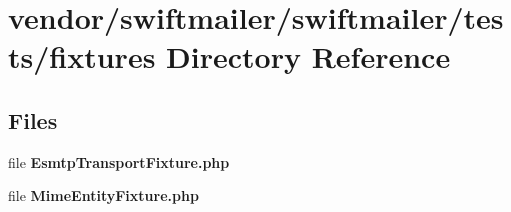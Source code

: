 \section{vendor/swiftmailer/swiftmailer/tests/fixtures Directory Reference}
\label{dir_cb93ca46459b0ee6d89acfe53fe00125}
\subsection*{Files}
\begin{DoxyCompactItemize}
\item 
file {\bf Esmtp\+Transport\+Fixture.\+php}
\item 
file {\bf Mime\+Entity\+Fixture.\+php}
\end{DoxyCompactItemize}
